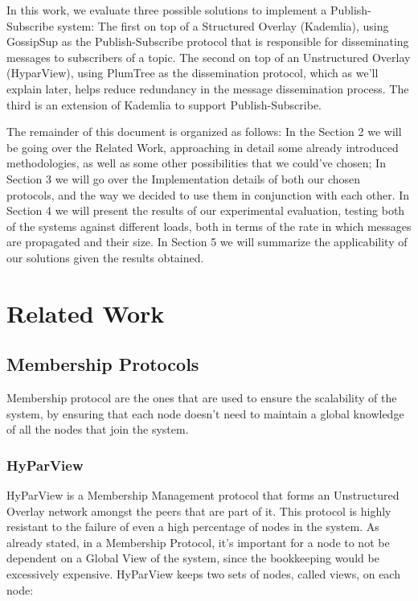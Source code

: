 \documentclass[sigconf]{acmart}
\begin{document}
In this work, we evaluate three possible solutions to implement a Publish-Subscribe system: The first on top of a Structured Overlay (Kademlia), using GossipSup as the Publish-Subscribe protocol that is responsible for disseminating messages to subscribers of a topic.
The second on top of an Unstructured Overlay (HyparView), using PlumTree as the dissemination protocol, which as we'll explain later, helps reduce redundancy in the message dissemination process.
The third is an extension of Kademlia to support Publish-Subscribe.

The remainder of this document is organized as follows:
In the Section 2 we will be going over the Related Work, approaching in detail some already introduced methodologies, as well as some other possibilities that we could've chosen; In Section 3 we will go over the Implementation details of both our chosen protocols, and the way we decided to use them in conjunction with each other. In Section 4 we will present the results of our experimental evaluation, testing both of the systems against different loads, both in terms of the rate in which messages are propagated and their size. In Section 5 we will summarize the applicability of our solutions given the results obtained.

\section{Related Work}

\subsection{Membership Protocols}

Membership protocol are the ones that are used to ensure the scalability of the system, by ensuring that each node doesn't need to maintain a global knowledge of all the nodes that join the system.

\subsubsection{HyParView}

HyParView is a Membership Management protocol that forms an Unstructured Overlay network amongst the peers that are part of it. 
This protocol is highly resistant to the failure of even a high percentage of nodes in the system. As already stated, in a Membership Protocol, it’s important for a node to not be dependent on a Global View of the system, since the bookkeeping would be excessively expensive. HyParView keeps two sets of nodes, called views, on each node: 
\end{document}
